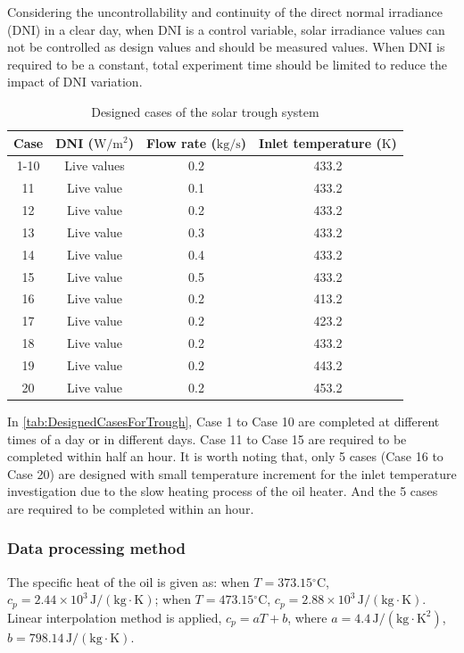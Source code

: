 
Considering the uncontrollability and continuity of the direct normal irradiance (DNI) in a clear day, when DNI is a control variable, solar irradiance values can not be controlled as design values and should be measured values. When DNI is required to be a constant, total experiment time should be limited to reduce the impact of DNI variation.

\begin{table}[htbp]
	\caption{Designed cases of the solar trough system}
	\centering
	\begin{tabular}{cccc}
		\toprule
		Case	& DNI ($\mathrm{W/m^2}$)	&	Flow rate ($\mathrm{kg/s}$)			&	Inlet temperature ($\mathrm{K}$)\\
		\midrule
		1-10	&	Live values	&	0.2	&	433.2\\
		11	&	Live value	&	0.1	&	433.2\\
		12	&	Live value	&	0.2	&	433.2\\
		13	&	Live value	&	0.3	&	433.2\\
		14	&	Live value	&	0.4	&	433.2\\
		15	&	Live value	&	0.5	&	433.2\\
		16	&	Live value	&	0.2	&	413.2\\
		17	&	Live value	&	0.2	&	423.2\\
		18	&	Live value	&	0.2	&	433.2\\
		19	&	Live value	&	0.2	&	443.2\\
		20	&	Live value	&	0.2	&	453.2\\
		\bottomrule
	\end{tabular}
	
	\label{tab:DesignedCasesForTrough}
\end{table}

In \autoref{tab:DesignedCasesForTrough}, Case 1 to Case 10 are completed at different times of a day or in different days. Case 11 to Case 15 are required to be completed within half an hour. It is worth noting that, only 5 cases (Case 16 to Case 20) are designed with small temperature increment for the inlet temperature investigation due to the slow heating process of the oil heater. And the 5 cases are required to be completed within an hour.

\subsubsection{Data processing method}
The specific heat of the oil is given as: when $T = 373.15\mathrm{^\circ C}$, $c_p = 2.44\times10^3\,\mathrm{J/(kg\cdot K)}$; when $T = 473.15\mathrm{^\circ C}$, $c_p = 2.88\times10^3\,\mathrm{J/(kg\cdot K)}$. Linear interpolation method is applied, $c_p = aT + b$, where $a = 4.4\,\mathrm{J/(kg \cdot K^2)}$, $b = 798.14\,\mathrm{J/(kg\cdot K)}$.

